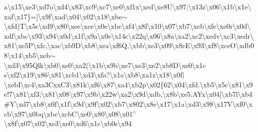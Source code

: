 \begin{DoxyCompactItemize}
a\textbackslash{}x15\textbackslash{}xe3\textbackslash{}xd7o\textbackslash{}xd4\textbackslash{}x83\textbackslash{}xc9\textbackslash{}xc7\textbackslash{}xe0\textbackslash{}xf1x\textbackslash{}xed\textbackslash{}xe8\+U\textbackslash{}x97;\textbackslash{}x13z\textbackslash{}x06\textbackslash{}x1b\textbackslash{}x1e\textbackslash{}xaf\textbackslash{}x17\}=\mbox{]}\textbackslash{}x9f\textbackslash{}xad\textbackslash{}x04\textbackslash{}x02\textbackslash{}x18\textbackslash{}xbe$\sim$\textbackslash{}xfd)\+T\textbackslash{}x5c\textbackslash{}xd9\textbackslash{}x80\textbackslash{}xee\textbackslash{}xce\textbackslash{}x0e\textbackslash{}xbc\textbackslash{}xf4\textbackslash{}x8f\textbackslash{}x10\textbackslash{}x07\textbackslash{}xb7\textbackslash{}xeb\textbackslash{}xfe\textbackslash{}xe0r\textbackslash{}x0d\textbackslash{}xdf\textbackslash{}xbc\textbackslash{}x93\textbackslash{}x94\textbackslash{}x0d\textbackslash{}x1f\textbackslash{}x9a\textbackslash{}x0e\textbackslash{}x14c\textbackslash{}x22q\textbackslash{}x06\textbackslash{}x8a\textbackslash{}xa2\textbackslash{}xc2\textbackslash{}xedv\textbackslash{}xc3\textbackslash{}xedr\textbackslash{}x81\textbackslash{}xe5\+P\textbackslash{}xfc,\textbackslash{}xac\textbackslash{}xb9\+D\textbackslash{}xb8\textbackslash{}xea\textbackslash{}xf6\+Q,\textbackslash{}xbb\textbackslash{}xe3\textbackslash{}x09\textbackslash{}x8c\+E\textbackslash{}x93\textbackslash{}xf8\textbackslash{}xce\+O\textbackslash{}xdb08\textbackslash{}x14\textbackslash{}xb5\textbackslash{}xeb$\sim$\textbackslash{}xd3\textbackslash{}x95\+Qlk\textbackslash{}xb0\textbackslash{}xe0\textbackslash{}xa2(\textbackslash{}x1b\textbackslash{}x9b\textbackslash{}xe7\textbackslash{}xe3\textbackslash{}xe2\textbackslash{}xb8\+D\textbackslash{}xe0\textbackslash{}x1c s\textbackslash{}xf2\textbackslash{}x19\textbackslash{}x86\textbackslash{}x81\textbackslash{}xcb1\textbackslash{}xd3\textbackslash{}xfa?\textbackslash{}x1a\textbackslash{}xb8\textbackslash{}xa1z\textbackslash{}x18\textbackslash{}x0f$\vert$\textbackslash{}xeb\+I\textbackslash{}xc4\textbackslash{}xa3\+Cxx\+C3\textbackslash{}x81k\textbackslash{}xf6\textbackslash{}x87\textbackslash{}xa4\textbackslash{}xb2p\textbackslash{}x02\{62\textbackslash{}x04\textbackslash{}xfd.\textbackslash{}xb5\textbackslash{}x5c\textbackslash{}x81\textbackslash{}x9e!7\textbackslash{}x81\textbackslash{}xf3;\textbackslash{}x81\textbackslash{}x08\textbackslash{}x97\textbackslash{}x9b\textbackslash{}x22w\textbackslash{}xa2\textbackslash{}x9d\textbackslash{}xdb,\textbackslash{}x8b\textbackslash{}xe5.\+A\+Yx\textbackslash{}x04\mbox{[}\textbackslash{}xb7l\textbackslash{}xb4\#\+Y\textbackslash{}xd7\textbackslash{}xb8\textbackslash{}x0f\textbackslash{}x1f\textbackslash{}x9d\textbackslash{}x9f\textbackslash{}x02\textbackslash{}xb7\textbackslash{}x802\textbackslash{}x8e\textbackslash{}x17\textbackslash{}x1a\textbackslash{}xd3\textbackslash{}x98\textbackslash{}x17\+V\textbackslash{}xf0\textbackslash{}xcb\textbackslash{}x97\textbackslash{}x0bq\textbackslash{}xbc\textbackslash{}xcb\+C\textbackslash{}xe0\textbackslash{}x80\textbackslash{}x08\textbackslash{}x01$^\wedge$\textbackslash{}x8f\textbackslash{}x07\textbackslash{}x02\textbackslash{}xe3\textbackslash{}xe0\textbackslash{}xd6\textbackslash{}x1c\textbackslash{}xb0s\textbackslash{}x94 
\end{DoxyCompactItemize}
